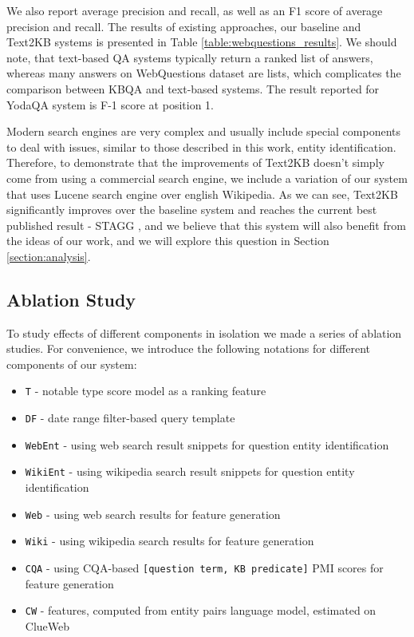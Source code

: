 We also report average precision and recall, as well as an F1 score of average precision and recall.
The results of existing approaches, our baseline and Text2KB systems is presented in Table \ref{table:webquestions_results}.
We should note, that text-based QA systems typically return a ranked list of answers, whereas many answers on WebQuestions dataset are lists, which complicates the comparison between KBQA and text-based systems.
The result reported for YodaQA system is F-1 score at position 1.

Modern search engines are very complex and usually include special components to deal with issues, similar to those described in this work, \eg entity identification.
Therefore, to demonstrate that the improvements of Text2KB doesn't simply come from using a commercial search engine, we include a variation of our system that uses Lucene search engine over english Wikipedia.
As we can see, Text2KB significantly improves over the baseline system and reaches the current best published result - STAGG \cite{yih2015semantic}, and we believe that this system will also benefit from the ideas of our work, and we will explore this question in Section \ref{section:analysis}.

\subsection{Ablation Study}
\label{section:eval:ablation}

To study effects of different components in isolation we made a series of ablation studies.
For convenience, we introduce the following notations for different components of our system:

\begin{itemize}[noitemsep,topsep=0pt]
\item \texttt{T} - notable type score model as a ranking feature
\item \texttt{DF} - date range filter-based query template
\item \texttt{WebEnt} - using web search result snippets for question entity identification
\item \texttt{WikiEnt} - using wikipedia search result snippets for question entity identification
\item \texttt{Web} - using web search results for feature generation
\item \texttt{Wiki} - using wikipedia search results for feature generation
\item \texttt{CQA} - using CQA-based \texttt{[question term, KB predicate]} PMI scores for feature generation
\item \texttt{CW} - features, computed from entity pairs language model, estimated on ClueWeb
\end{itemize}

